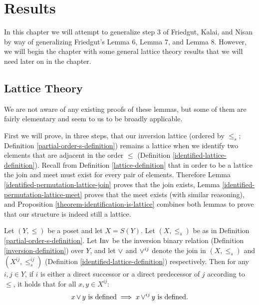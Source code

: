 
\chapter{Results}

	In this chapter we will attempt to generalize step 3 of Friedgut, Kalai, and Nisan by way of generalizing Friedgut's Lemma 6, Lemma 7, and Lemma 8. However, we will begin the chapter with some general lattice theory results that we will need later on in the chapter.

\section{Lattice Theory}

	We are not aware of any existing proofs of these lemmas, but some of them are fairly elementary and seem to us to be broadly applicable.

	First we will prove, in three steps, that our inversion lattice (ordered by $\le_s$; Definition \ref{partial-order-s-definition}) remains a lattice when we identify two elements that are adjacent in the order $\le$ (Definition \ref{identified-lattice-definition}). Recall from Definition \ref{lattice-definition} that in order to be a lattice the join and meet must exist for every pair of elements. Therefore Lemma \ref{identified-permutation-lattice-join} proves that the join exists, Lemma \ref{identified-permutation-lattice-meet} proves that the meet exists (with similar reasoning), and Proposition \ref{theorem-identification-is-lattice} combines both lemmas to prove that our structure is indeed still a lattice.

	\begin{lemma}
		\label{identified-permutation-lattice-join}
		Let $(Y, \le)$ be a poset and let $X = S(Y)$. Let $(X, \le_s)$ be as in Definition \ref{partial-order-s-definition}. Let $\operatorname{Inv}$ be the inversion binary relation (Definition \ref{inversion-definition}) over $Y$, and let $\operatorname{\vee}$ and $\operatorname{\vee}^{ij}$ denote the join in $(X, \le_s)$ and $(X^{ij}, \le^{ij}_s)$ (Definition \ref{identified-lattice-definition}) respectively. Then for any $i,j \in Y$, if $i$ is either a direct successor or a direct predecessor of $j$ according to $\le$, it holds that for all $x, y \in X^{ij}$:
		\[
			x \operatorname{\vee} y \text{ is defined} \implies x \operatorname{\vee}^{ij} y \text{ is defined}.
		\]
	\end{lemma}


